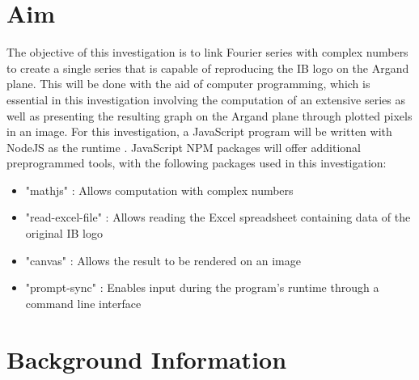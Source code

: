 \documentclass[letterpaper, 12pt]{article}
\begin{document}
\section{Aim}

The objective of this investigation is to link Fourier series with
complex numbers to create a single series that is capable
of reproducing the IB logo on the Argand plane. This will be
done with the aid of computer programming, which is essential in
this investigation involving the computation of an extensive series
as well as presenting the resulting graph on the Argand plane
through plotted pixels in an image. For this investigation,
a JavaScript program will be written with NodeJS as the runtime \cite{NodeJs}.
JavaScript NPM packages will offer additional preprogrammed tools,
with the following packages used in this investigation:

\begin{itemize}
    \item "mathjs" \cite{dejongMathjs}: Allows computation with complex numbers
    \item "read-excel-file" \cite{kuchumovReadexcelfile}: Allows reading the Excel spreadsheet containing data of the original IB logo
    \item "canvas" \cite{automatticCanvas}: Allows the result to be rendered on an image
    \item "prompt-sync" \cite{fragomeniPromptsync}: Enables input during the program's runtime through a command line interface
\end{itemize}



\section{Background Information}
\end{document}
